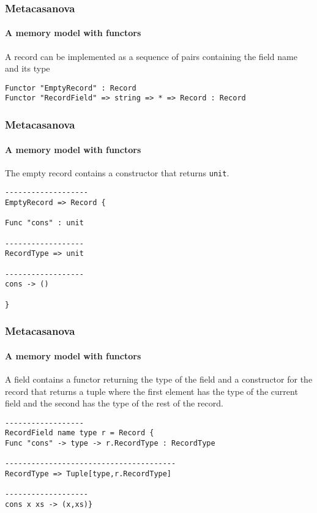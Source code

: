 \documentclass[10pt,a4paper]{beamer}
\begin{document}
\begin{frame}[fragile]
\frametitle{Metacasanova}
\framesubtitle{A memory model with functors}

A record can be implemented as a sequence of pairs containing the field name and its type

\begin{lstlisting}
Functor "EmptyRecord" : Record
Functor "RecordField" => string => * => Record : Record
\end{lstlisting}
\end{frame}

\begin{frame}[fragile]
\frametitle{Metacasanova}
\framesubtitle{A memory model with functors}

The empty record contains a constructor that returns \texttt{unit}.

\begin{lstlisting}
-------------------
EmptyRecord => Record {

Func "cons" : unit

------------------
RecordType => unit

------------------
cons -> ()

}
\end{lstlisting}

\end{frame}

\begin{frame}[fragile]
\frametitle{Metacasanova}
\framesubtitle{A memory model with functors}

A field contains a functor returning the type of the field and a constructor for the record that returns a tuple where the first element has the type of the current field and the second has the type of the rest of the record.

\begin{lstlisting}
------------------
RecordField name type r = Record {
Func "cons" -> type -> r.RecordType : RecordType

---------------------------------------
RecordType => Tuple[type,r.RecordType]

-------------------
cons x xs -> (x,xs)} 
\end{lstlisting}
\end{frame}
\end{document}
